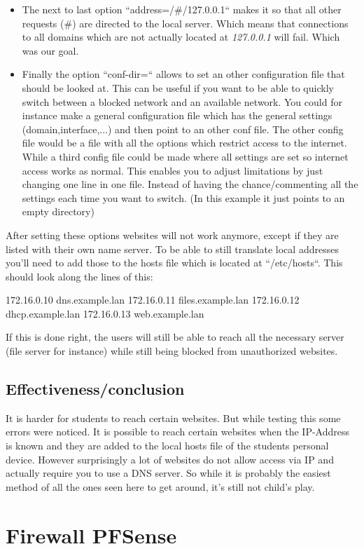 \begin{itemize}
\item The next to last option ``address=/\#/127.0.0.1`` makes it so that all other requests (\#) are directed to the local server. Which means that connections to all domains which are not actually located at \textit{127.0.0.1} will fail. Which was our goal.
\item Finally the option ``conf-dir=`` allows to set an other configuration file that should be looked at. This can be useful if you want to be able to quickly switch between a blocked network and an available network. You could for instance make a general configuration file which has the general settings (domain,interface,...) and then point to an other conf file. The other config file would be a file with all the options which restrict access to the internet. While a third config file could be made where all settings are set so internet access works as normal. This enables you to adjust limitations by just changing one line in one file. Instead of having the chance/commenting all the settings each time you want to switch. (In this example it just points to an empty directory)
\end{itemize}
After setting these options websites will not work anymore, except if they are listed with their own name server. To be able to still translate local addresses you'll need to add those to the hosts file which is located at ``/etc/hosts``. This should look along the lines of this:
\begin{cisco}[title=/etc/hosts file]
172.16.0.10 dns.example.lan
172.16.0.11 files.example.lan
172.16.0.12 dhcp.example.lan
172.16.0.13 web.example.lan
\end{cisco}
If this is done right, the users will still be able to reach all the necessary server (file server for instance) while still being blocked from unauthorized websites.
\subsection{Effectiveness/conclusion}
It is harder for students to reach certain websites. But while testing this some errors were noticed. It is possible to reach certain websites when the IP-Address is known and they are added to the local hosts file of the students personal device. However surprisingly a lot of websites do not allow access via IP and actually require you to use a DNS server. So while it is probably the easiest method of all the ones seen here to get around, it's still not child's play.
\section{Firewall PFSense}
